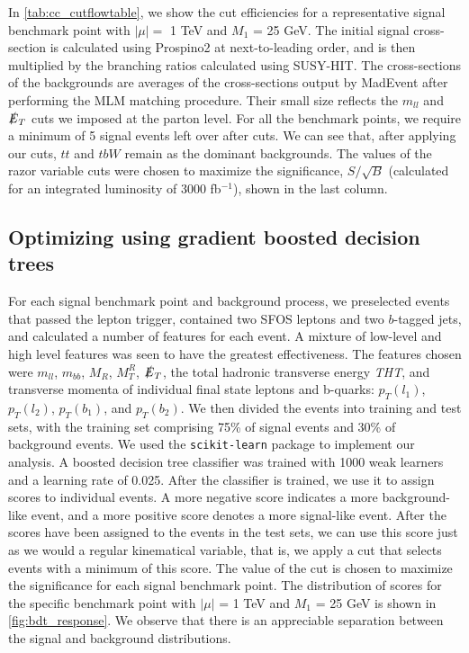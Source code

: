 In \autoref{tab:cc_cutflowtable}, we show the cut efficiencies for a representative signal benchmark point with $|\mu| = $ 1 TeV and $M_1$ = 25 GeV. The initial signal cross-section is calculated using Prospino2 at next-to-leading order, and is then multiplied by the branching ratios calculated using SUSY-HIT. The cross-sections of the backgrounds are averages of the cross-sections output by MadEvent after performing the MLM matching procedure. Their small size reflects the $m_{ll}$ and $\slashed{E}_T$ cuts we imposed at the parton level. For all the benchmark points, we require a minimum of 5 signal events left over after cuts. We can see that, after applying our cuts, $tt$ and $tbW$ remain as the dominant backgrounds. The values of the razor variable cuts were chosen to maximize the significance, $S/\sqrt{B}$ (calculated for an integrated luminosity of 3000 fb$^{-1}$), shown in the last column.

\subsection{Optimizing using gradient boosted decision trees}\label{subsec:bdt}

For each signal benchmark point and background process, we preselected events that passed the lepton trigger, contained two SFOS leptons and two $b$-tagged jets, and calculated a number of features for each event. A mixture of low-level and high level features was seen to have the greatest effectiveness. The features chosen were $m_{ll}$, $m_{bb}$, $M_R$, $M_T^R$, $\slashed{E}_T$, the total hadronic transverse energy \emph{THT}, and transverse momenta of individual final state leptons and b-quarks: $p_T(l_1)$, $p_T(l_2)$, $p_T(b_1)$, and $p_T(b_2)$. We then divided the events into training and test sets, with the training set comprising 75\% of signal events and 30\% of background events. We used the \texttt{scikit-learn} package  \citep{Pedregosa2011} to implement our analysis. A boosted decision tree classifier was trained with 1000 weak learners and a learning rate of 0.025. After the classifier is trained, we use it to assign scores to individual events. A more negative score indicates a more background-like event, and a more positive score denotes a more signal-like event. After the scores have been assigned to the events in the test sets, we can use this score just as we would a regular kinematical variable, that is, we apply a cut that selects events with a minimum of this score. The value of the cut is chosen to maximize the significance for each signal benchmark point. The distribution of scores for the specific benchmark point with $|\mu|$ = 1 TeV and $M_1$ = 25 GeV is shown in \autoref{fig:bdt_response}. We observe that there is an appreciable separation between the signal and background distributions.

